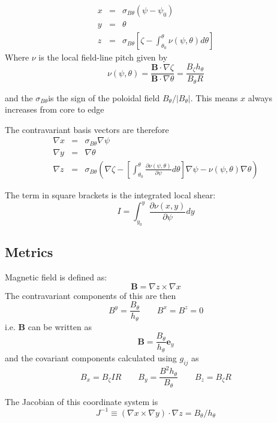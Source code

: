 \documentclass[12pt, a4paper]{article}
\newcommand{\deriv}[2]{\ensuremath{\frac{\partial #1}{\partial #2}}}
\newcommand{\hthe}{\ensuremath{h_\theta}}
\newcommand{\Bp}{\ensuremath{B_\theta}}
\newcommand{\Bt}{\ensuremath{B_\zeta}}
\newcommand{\Vec}[1]{\ensuremath{\mathbf{#1}}}
\newcommand{\Bvec}{\Vec{B}}
\newcommand{\sbp}{\ensuremath{\sigma_{B\theta}}}
\begin{document}
\begin{eqnarray}
x &=& \sbp\left(\psi - \psi_0\right) \\ 
y &=& \theta \\
z &=& \sbp\left[\zeta - \int_{\theta_0}^{\theta}\nu\left(\psi, \theta\right)d\theta\right]
\label{eq:coordtransform}
\end{eqnarray}
Where $\nu$ is the local field-line pitch given by
\begin{equation}
\nu\left(\psi, \theta\right) = \frac{\mathbf{B}\cdot\nabla\zeta}{\mathbf{B}\cdot\nabla\theta} = \frac{\Bt\hthe}{\Bp R}
\end{equation}

and the \sbp is the sign of the poloidal field $\Bp / \left|\Bp\right|$. This means $x$ always increases from core to edge

The contravariant basis vectors are therefore
\begin{eqnarray*}
\nabla x &=& \sbp \nabla \psi \\
\nabla y &=& \nabla \theta \\
\nabla z &=& \sbp \left( \nabla\zeta - \left[\int_{\theta_0}^\theta\deriv{\nu\left(\psi, \theta\right)}{\psi} d\theta\right] \nabla\psi - \nu\left(\psi, \theta\right)\nabla\theta \right)
\end{eqnarray*}

The term in square brackets is the integrated local shear:
\[
I = \int_{y_0}^y\frac{\partial\nu\left(x, y\right)}{\partial\psi}dy
\]

\subsection{Metrics}

Magnetic field is defined as:
\[
\mathbf{B} = \nabla z\times \nabla x
\]
The contravariant components of this are then
\begin{equation}
B^y = \frac{\Bp}{\hthe} \qquad B^x = B^z = 0
\label{eq:B_contravariant}
\end{equation}
i.e. $\Bvec$ can be written as
\begin{equation}
\Bvec = \frac{\Bp}{\hthe}\mathbf{e}_y
\label{eq:Bvec_cont}
\end{equation}
and the covariant components calculated using $g_{ij}$ as
\begin{equation}
B_x = \Bt I R \qquad B_y = \frac{B^2 \hthe}{\Bp} \qquad B_z = \Bt R
\label{eq:B_covariant}
\end{equation}

The Jacobian of this coordinate system is
\[
J^{-1} \equiv \left(\nabla x\times\nabla y\right)\cdot\nabla z = \Bp / \hthe
\]
\end{document}
